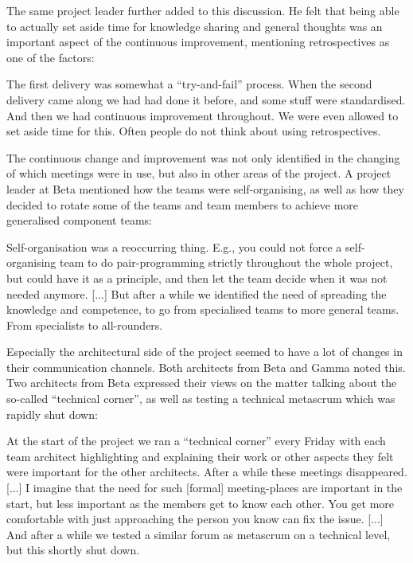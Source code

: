 The same project leader further added to this discussion. He felt that being able to actually set aside time for knowledge sharing and general thoughts was an important aspect of the continuous improvement, mentioning retrospectives as one of the factors:

\begin{fancyquotes}
The first delivery was somewhat a ``try-and-fail'' process. When the second delivery came along we had had done it before, and some stuff were standardised. And then we had continuous improvement throughout. We were even allowed to set aside time for this. Often people do not think about using retrospectives.
\end{fancyquotes}

The continuous change and improvement was not only identified in the changing of which meetings were in use, but also in other areas of the project. A project leader at Beta mentioned how the teams were self-organising, as well as how they decided to rotate some of the teams and team members to achieve more generalised component teams:

\begin{fancyquotes}
Self-organisation was a reoccurring thing. E.g., you could not force a self-organising team to do pair-programming strictly throughout the whole project, but could have it as a principle, and then let the team decide when it was not needed anymore. [...] But after a while we identified the need of spreading the knowledge and competence, to go from specialised teams to more general teams. From specialists to all-rounders.
\end{fancyquotes}

Especially the architectural side of the project seemed to have a lot of changes in their communication channels. Both architects from Beta and Gamma noted this. Two architects from Beta expressed their views on the matter talking about the so-called ``technical corner'', as well as testing a technical metascrum which was rapidly shut down:

\begin{fancyquotes}
At the start of the project we ran a ``technical corner'' every Friday with each team architect highlighting and explaining their work or other aspects they felt were important for the other architects. After a while these meetings disappeared. [...] I imagine that the need for such [formal] meeting-places are important in the start, but less important as the members get to know each other. You get more comfortable with just approaching the person you know can fix the issue. [...] And after a while we tested a similar forum as metascrum on a technical level, but this shortly shut down.
\end{fancyquotes}

